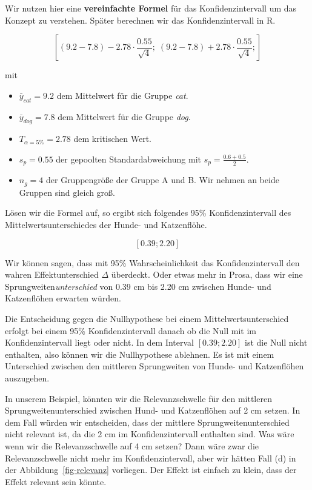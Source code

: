 \documentclass[
  letterpaper,
  DIV=11,
  oneside]{scrreport}
\providecommand{\tightlist}{%
  \setlength{\itemsep}{0pt}\setlength{\parskip}{0pt}}\usepackage{longtable,booktabs,array}
\begin{document}
Wir nutzen hier eine \textbf{vereinfachte Formel} für das
Konfidenzintervall um das Konzept zu verstehen. Später berechnen wir das
Konfidenzintervall in R.

\[
\left[
(9.2-7.8) - 
2.78 \cdot \frac {0.55}{\sqrt{4}}; \;
(9.2-7.8) + 
2.78 \cdot \frac {0.55}{\sqrt{4}};
\right]
\]

mit

\begin{itemize}
\tightlist
\item
  \(\bar{y}_{cat} = 9.2\) dem Mittelwert für die Gruppe \emph{cat}.
\item
  \(\bar{y}_{dog} = 7.8\) dem Mittelwert für die Gruppe \emph{dog}.
\item
  \(T_{\alpha = 5\%} = 2.78\) dem kritischen Wert.
\item
  \(s_p = 0.55\) der gepoolten Standardabweichung mit
  \(s_p = \tfrac{0.6 + 0.5}{2}\).
\item
  \(n_g = 4\) der Gruppengröße der Gruppe A und B. Wir nehmen an beide
  Gruppen sind gleich groß.
\end{itemize}

Lösen wir die Formel auf, so ergibt sich folgendes 95\%
Konfidenzintervall des Mittelwertsunterschiedes der Hunde- und
Katzenflöhe.

\[[0.39; 2.20]\]

Wir können sagen, dass mit 95\% Wahrscheinlichkeit das
Konfidenzintervall den wahren Effektunterschied \(\Delta\) überdeckt.
Oder etwas mehr in Prosa, dass wir eine Sprungweiten\emph{unterschied}
von 0.39 cm bis 2.20 cm zwischen Hunde- und Katzenflöhen erwarten
würden.

Die Entscheidung gegen die Nullhypothese bei einem
Mittelwertsunterschied erfolgt bei einem 95\% Konfidenzintervall danach
ob die Null mit im Konfidenzintervall liegt oder nicht. In dem Interval
\([0.39; 2.20]\) ist die Null nicht enthalten, also können wir die
Nullhypothese ablehnen. Es ist mit einem Unterschied zwischen den
mittleren Sprungweiten von Hunde- und Katzenflöhen auszugehen.

In unserem Beispiel, könnten wir die Relevanzschwelle für den mittleren
Sprungweitenunterschied zwischen Hund- und Katzenflöhen auf 2 cm setzen.
In dem Fall würden wir entscheiden, dass der mittlere
Sprungweitenunterschied nicht relevant ist, da die 2 cm im
Konfidenzintervall enthalten sind. Was wäre wenn wir die
Relevanzschwelle auf 4 cm setzen? Dann wäre zwar die Relevanzschwelle
nicht mehr im Konfidenzintervall, aber wir hätten Fall (d) in der
Abbildung~\ref{fig-relevanz} vorliegen. Der Effekt ist einfach zu klein,
dass der Effekt relevant sein könnte.
\end{document}
